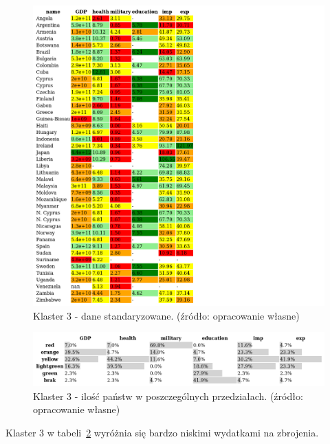 \documentclass[11pt]{report}
\begin{document}
    \begin{figure}[!htp]
        \centering
        \includegraphics[width=1 \textwidth]{tables/CLUST/cluster3stdkmeans.png}
        \caption{Klaster 3 - dane standaryzowane. (źródło: opracowanie własne)}
        \label{tab:cl3std}
    \end{figure}
    

    \begin{figure}[!htp]
        \centering
        \includegraphics[width=1 \textwidth]{tables/CLUST/cluster3stdkmeanscount.png}
        \caption{Klaster 3 - ilość państw w poszczególnych przedziałach. (źródło: opracowanie własne)}
        \label{tab:cl3stdcount}
    \end{figure}

    Klaster 3 w tabeli~\ref{tab:cl3stdcount} wyróżnia się bardzo niskimi wydatkami na zbrojenia.
\end{document}
